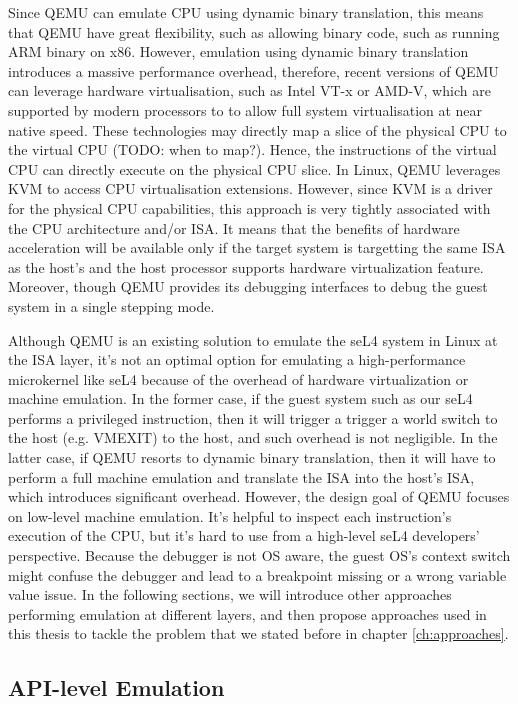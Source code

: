 Since QEMU can emulate CPU using dynamic binary translation, this means that QEMU have great flexibility, such as allowing binary code, such as running ARM binary on x86. However, emulation using dynamic binary translation introduces a massive performance overhead, therefore, recent versions of QEMU can leverage hardware virtualisation, such as Intel VT-x or AMD-V, which are supported by modern processors to to allow full system virtualisation at near native speed. These technologies may directly map a slice of the physical CPU to the virtual CPU (TODO: when to map?). Hence, the instructions of the virtual CPU can directly execute on the physical CPU slice. In Linux, QEMU leverages KVM to access CPU virtualisation extensions. However, since KVM is a driver for the physical CPU capabilities, this approach is very tightly associated with the CPU architecture and/or ISA. It means that the benefits of hardware acceleration will be available only if the target system is targetting the same ISA as the host's and the host processor supports hardware virtualization feature. Moreover, though QEMU provides its debugging interfaces to debug the guest system in a single stepping mode.

Although QEMU is an existing solution to emulate the seL4 system in Linux at the ISA layer, it's not an optimal option for emulating a high-performance microkernel like seL4 because of the overhead of hardware virtualization or machine emulation. In the former case, if the guest system such as our seL4 performs a privileged instruction, then it will trigger a trigger a world switch to the host (e.g. VMEXIT) to the host, and such overhead is not negligible. In the latter case, if QEMU resorts to dynamic binary translation, then it will have to perform a full machine emulation and translate the ISA into the host's ISA, which introduces significant overhead. However, the design goal of QEMU focuses on low-level machine emulation. It's helpful to inspect each instruction's execution of the CPU, but it's hard to use from a high-level seL4 developers' perspective. Because the debugger is not OS aware, the guest OS's context switch might confuse the debugger and lead to a breakpoint missing or a wrong variable value issue. In the following sections, we will introduce other approaches performing emulation at different layers, and then propose approaches used in this thesis to tackle the problem that we stated before in chapter \ref{ch:approaches}.


\subsection{API-level Emulation}

